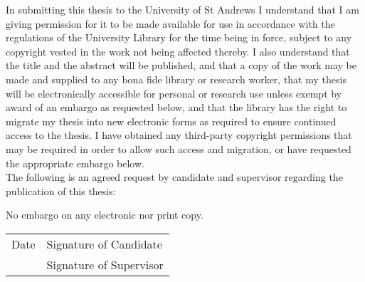 \begin{declaration}
In submitting this thesis to the University of St Andrews I understand that I am giving permission for it to be made available for use in accordance with the regulations of the University Library for the time being in force, subject to any copyright vested in the work not being affected thereby.
I also understand that the title and the abstract will be published, and that a copy of the work may be made and supplied to any bona fide library or research worker, that my thesis will be electronically accessible for personal or research use unless exempt by award of an embargo as requested below, and that the library has the right to migrate my thesis into new electronic forms as required to ensure continued access to the thesis.
I have obtained any third-party copyright permissions that may be required in order to allow such access and migration, or have requested the appropriate embargo below.
\\

\noindent
The following is an agreed request by candidate and supervisor regarding the publication of this thesis:

\begin{center}
No embargo on any electronic nor print copy.
\end{center}

\vspace{3em}
\begin{tabularx}{0.9\textwidth}{p{}X}
Date\xspace\dotfill & Signature of Candidate\xspace\dotfill \\[3em]
                    & Signature of Supervisor\xspace\dotfill \\
\end{tabularx}
\end{declaration}
